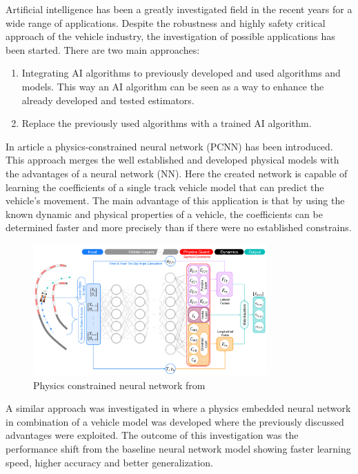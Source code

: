 Artificial intelligence has been a greatly investigated field in the recent years for a wide range of applications. Despite the robustness and highly safety critical approach of the vehicle industry, the investigation of possible applications has been started. There are two main approaches: 
\begin{enumerate}
    \item Integrating AI algorithms to previously developed and used algorithms and models. This way an AI algorithm can be seen as a way to enhance the already developed and tested estimators.
    \item Replace the previously used algorithms with a trained AI algorithm.
\end{enumerate}
In article \cite{lit_deep_dynamics} a physics-constrained neural network (PCNN) has been introduced. This approach merges the well established and developed physical models with the advantages of a neural network (NN). Here the created network is capable of learning the coefficients of a single track vehicle model that can predict the vehicle's movement. The main advantage of this application is that by using the known dynamic and physical properties of a vehicle, the coefficients can be determined faster and more precisely than if there were no established constrains. 
\FloatBarrier
\begin{figure}[ht]
    \centering
    \includegraphics[width=0.8\textwidth]{images/deep_dynamics.png}
    \caption{Physics constrained neural network from \cite{lit_deep_dynamics}}
    \label{fig:deep_dynamics}
\end{figure}
\FloatBarrier
A similar approach was investigated in \cite{lit_ai_physiscs_embedded_neural_network} where a physics embedded neural network in combination of a vehicle model was developed where the previously discussed advantages were exploited. The outcome of this investigation was the performance shift from the baseline neural network model showing faster learning speed, higher accuracy and better generalization. 
